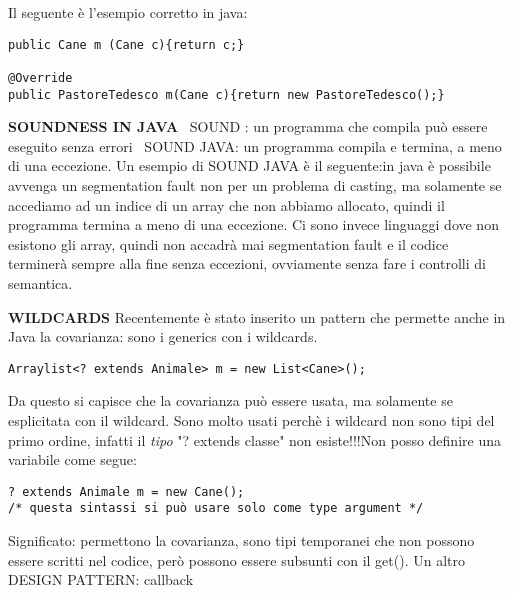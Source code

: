 \noindent Il seguente è l'esempio corretto in java:
\begin{lstlisting}[basicstyle=\small,]
public Cane m (Cane c){return c;}

@Override
public PastoreTedesco m(Cane c){return new PastoreTedesco();}
\end{lstlisting}

\noindent \textbf{SOUNDNESS IN JAVA} \newline
\textbullet\ SOUND : un programma che compila può essere eseguito senza errori \newline
\textbullet\ SOUND JAVA: un programma compila e termina, a meno di una eccezione. \newline
Un esempio di SOUND JAVA è il seguente:in java è possibile avvenga un segmentation fault non per un problema di casting, ma solamente se accediamo ad un indice di un array che non abbiamo allocato, quindi il programma termina a meno di una eccezione. Ci sono invece linguaggi dove non esistono gli array, quindi non accadrà mai segmentation fault e il codice terminerà sempre alla fine senza eccezioni, ovviamente senza fare i controlli di semantica. 

\noindent \textbf{WILDCARDS} \newline
\noindent Recentemente è stato inserito un pattern che permette anche in Java la covarianza: sono i generics con i wildcards. 
\begin{lstlisting}[basicstyle=\small,]
Arraylist<? extends Animale> m = new List<Cane>();
\end{lstlisting}
\noindent Da questo si capisce che la covarianza può essere usata, ma solamente se esplicitata con il wildcard. \newline
Sono molto usati perchè i wildcard non sono tipi del primo ordine, infatti il \textit{tipo} "? extends classe" non esiste!!!Non posso definire una variabile come segue: 
\begin{lstlisting}[basicstyle=\small,]
? extends Animale m = new Cane();
/* questa sintassi si può usare solo come type argument */
\end{lstlisting}
Significato: permettono la covarianza, sono tipi temporanei che non possono essere scritti nel codice, però possono essere subsunti con il get(). \newline
Un altro DESIGN PATTERN: callback














